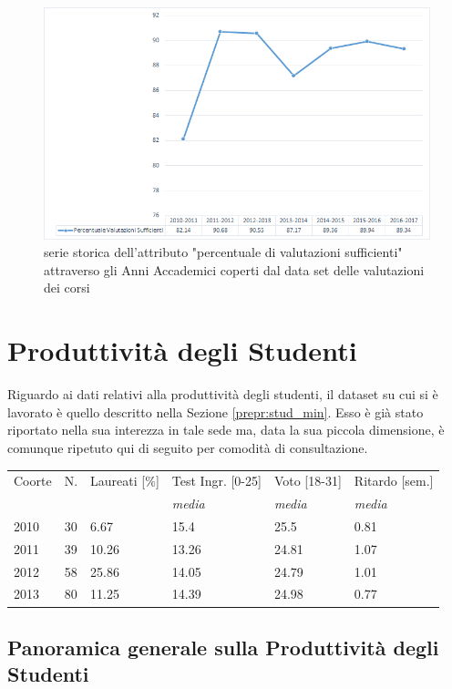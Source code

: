     \begin{figure}
        \centering
        \caption{serie storica dell'attributo "percentuale di valutazioni sufficienti" attraverso gli Anni Accademici coperti dal data set delle valutazioni dei corsi}
        \label{eval_p}
        \includegraphics[scale=0.56]{../visual/eval_2.png}
    \end{figure}

\section{Produttività degli Studenti}

    Riguardo ai dati relativi alla produttività degli studenti, il dataset su cui si è lavorato è quello descritto nella Sezione \ref{prepr:stud_min}. Esso è già stato riportato nella sua interezza in tale sede ma, data la sua piccola dimensione, è comunque ripetuto qui di seguito per comodità di consultazione. \\

    \noindent\begin{tabular}{llllll}
		\hline
		Coorte & N. & Laureati {[}\%{]} & Test Ingr. [0-25] & Voto [18-31] & Ritardo [sem.] \\
		 &  & & \textit{media} & \textit{media} & \textit{media}\\
		\hline
		2010 & 30 & 6.67 & 15.4 & 25.5 & 0.81 \\
		2011 & 39 & 10.26 & 13.26 & 24.81 & 1.07 \\
		2012 & 58 & 25.86 & 14.05 & 24.79 & 1.01 \\
		2013 & 80 & 11.25 & 14.39 & 24.98 & 0.77 \\ \hline
	\end{tabular}

    \subsection{Panoramica generale sulla Produttività degli Studenti}

